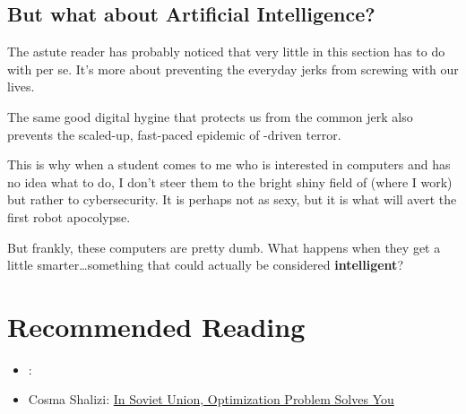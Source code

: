 \subsection{But what about Artificial Intelligence?}

The astute reader has probably noticed that very little in this
section has to do with  per se.  It's more about preventing
the everyday jerks from screwing with our lives.

The same good digital hygine that protects us from the common jerk
also prevents the scaled-up, fast-paced epidemic of -driven terror.  

This is why when a student comes to me who is interested in computers
and has no idea what to do, I don't steer them to the bright shiny
field of  (where I work) but rather to cybersecurity.  It is
perhaps not as sexy, but it is what will avert the first robot apocolypse.

But frankly, these computers are pretty dumb.  What happens when they
get a little smarter\dots something that could actually be considered
{\bf intelligent}?


\clearpage

\section{Recommended Reading}


\begin{itemize}

  \item \citet{spufford-10}: 

  \item Cosma Shalizi: \href{http://crookedtimber.org/2012/05/30/in-soviet-union-optimization-problem-solves-you/}{In Soviet Union, Optimization Problem Solves You}

\end{itemize}
